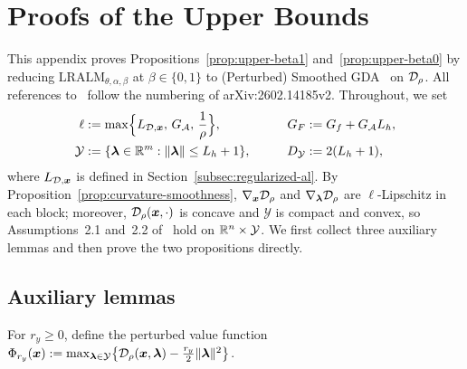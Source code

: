 \section{Proofs of the Upper Bounds}
\label{app:upper-bounds}

This appendix proves Propositions~\ref{prop:upper-beta1} and~\ref{prop:upper-beta0}
by reducing \(\mathrm{LRALM}_{\theta,\alpha,\beta}\) at \(\beta\in\{0,1\}\) to
(Perturbed) Smoothed GDA~\cite{li2026smoothing} on \(\mathcal{D}_\rho\). All
references to~\cite{li2026smoothing} follow the numbering of
arXiv:2602.14185v2. Throughout, we set
\[
\begin{aligned}
\ell&:=\max\Bigl\{L_{\mathcal{D},\bm{x}},\,G_{\mathcal{A}},\,\frac1\rho\Bigr\},
&\qquad G_F&:=G_f+G_{\mathcal{A}}L_h,\\
\mathcal Y&:=\{\bm{\lambda}\in\mathbb{R}^m:\|\bm{\lambda}\|\le L_h+1\},
&\qquad D_{\mathcal Y}&:=2(L_h+1),
\end{aligned}
\]
where \(L_{\mathcal{D},\bm{x}}\) is defined in Section~\ref{subsec:regularized-al}. By
Proposition~\ref{prop:curvature-smoothness}, \(\nabla_{\bm{x}}\mathcal{D}_\rho\) and
\(\nabla_{\bm{\lambda}}\mathcal{D}_\rho\) are \(\ell\)-Lipschitz in each block; moreover,
\(\mathcal{D}_\rho(\bm{x},\cdot)\) is concave and \(\mathcal Y\) is compact and convex,
so Assumptions~2.1 and~2.2 of~\cite{li2026smoothing} hold on
\(\mathbb{R}^n\times\mathcal Y\). We first collect three auxiliary lemmas and then
prove the two propositions directly.

\subsection{Auxiliary lemmas}
\label{app:upper-lemmas}

For \(r_y\ge0\), define the perturbed value function
\(\Phi_{r_y}(\bm{x}):=\max_{\bm{\lambda}\in\mathcal Y}\bigl\{\mathcal{D}_\rho(\bm{x},\bm{\lambda})
-\frac{r_y}{2}\|\bm{\lambda}\|^2\bigr\}\).


